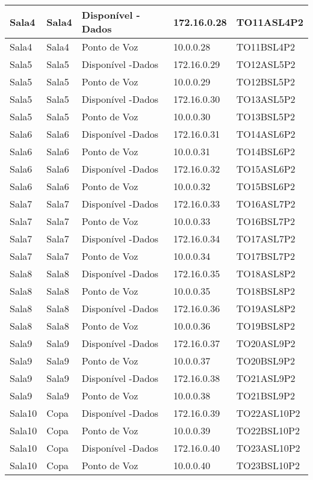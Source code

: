 \begin{table}[]
\begin{tabular}{|l|l|l|l|l|}
Sala4 & Sala4 & Disponível - Dados & 172.16.0.28 & TO11ASL4P2 \\ \hline
Sala4 & Sala4 & Ponto de Voz & 10.0.0.28 & TO11BSL4P2 \\ \hline
Sala5 & Sala5 & Disponível -Dados & 172.16.0.29 & TO12ASL5P2 \\ \hline
Sala5 & Sala5 & Ponto de Voz & 10.0.0.29 & TO12BSL5P2 \\ \hline
Sala5 & Sala5 & Disponível -Dados & 172.16.0.30 & TO13ASL5P2 \\ \hline
Sala5 & Sala5 & Ponto de Voz & 10.0.0.30 & TO13BSL5P2 \\ \hline
Sala6 & Sala6 & Disponível -Dados & 172.16.0.31 & TO14ASL6P2 \\ \hline
Sala6 & Sala6 & Ponto de Voz & 10.0.0.31 & TO14BSL6P2 \\ \hline
Sala6 & Sala6 & Disponível -Dados & 172.16.0.32 & TO15ASL6P2 \\ \hline
Sala6 & Sala6 & Ponto de Voz & 10.0.0.32 & TO15BSL6P2 \\ \hline
Sala7 & Sala7 & Disponível -Dados & 172.16.0.33 & TO16ASL7P2 \\ \hline
Sala7 & Sala7 & Ponto de Voz & 10.0.0.33 & TO16BSL7P2 \\ \hline
Sala7 & Sala7 & Disponível -Dados & 172.16.0.34 & TO17ASL7P2 \\ \hline
Sala7 & Sala7 & Ponto de Voz & 10.0.0.34 & TO17BSL7P2 \\ \hline
Sala8 & Sala8 & Disponível -Dados & 172.16.0.35 & TO18ASL8P2 \\ \hline
Sala8 & Sala8 & Ponto de Voz & 10.0.0.35 & TO18BSL8P2 \\ \hline
Sala8 & Sala8 & Disponível -Dados & 172.16.0.36 & TO19ASL8P2 \\ \hline
Sala8 & Sala8 & Ponto de Voz & 10.0.0.36 & TO19BSL8P2 \\ \hline
Sala9 & Sala9 & Disponível -Dados & 172.16.0.37 & TO20ASL9P2 \\ \hline
Sala9 & Sala9 & Ponto de Voz & 10.0.0.37 & TO20BSL9P2 \\ \hline
Sala9 & Sala9 & Disponível -Dados & 172.16.0.38 & TO21ASL9P2 \\ \hline
Sala9 & Sala9 & Ponto de Voz & 10.0.0.38 & TO21BSL9P2 \\ \hline
Sala10 & Copa & Disponível -Dados & 172.16.0.39 & TO22ASL10P2 \\ \hline
Sala10 & Copa & Ponto de Voz & 10.0.0.39 & TO22BSL10P2 \\ \hline
Sala10 & Copa & Disponível -Dados & 172.16.0.40 & TO23ASL10P2 \\ \hline
Sala10 & Copa & Ponto de Voz & 10.0.0.40 & TO23BSL10P2 \\ \hline
\end{tabular}
\end{table}